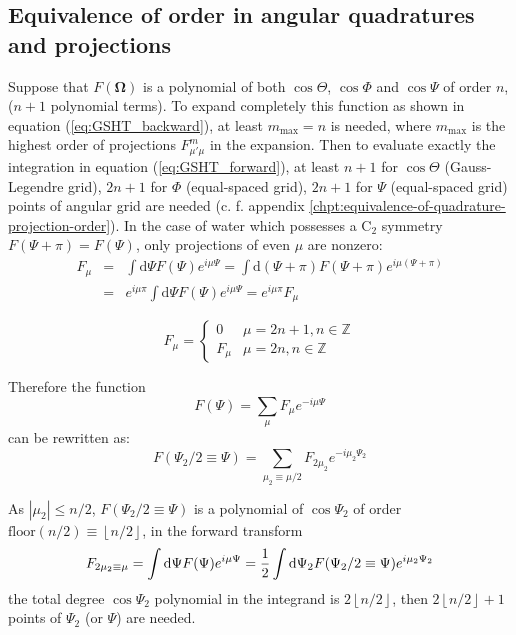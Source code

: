 \subsection{Equivalence of order in angular quadratures and projections}

Suppose that $F(\mathbf{\Omega})$ is a polynomial of both $\cos\Theta$,
$\cos\Phi$ and $\cos\Psi$ of order $n$, ($n+1$ polynomial terms).
To expand completely this function as shown in equation (\ref{eq:GSHT_backward}),
at least $m_{\mathrm{max}}=n$ is needed, where $m_{\mathrm{max}}$
is the highest order of projections $F_{\mu'\mu}^{m}$ in the expansion.
Then to evaluate exactly the integration in equation (\ref{eq:GSHT_forward}),
at least $n+1$ for $\cos\Theta$ (Gauss-Legendre grid), $2n+1$ for
$\Phi$ (equal-spaced grid), $2n+1$ for $\Psi$ (equal-spaced grid)
points of angular grid are needed (c. f. appendix \ref{chpt:equivalence-of-quadrature-projection-order}).
In the case of water which possesses a $\mathrm{C}_{2}$ symmetry
$F(\Psi+\pi)=F(\Psi)$, only projections of even $\mu$ are nonzero:
\begin{eqnarray}
F_{\mu} & = & \int\mathrm{d}\Psi F(\Psi)e^{i\mu\Psi}=\int\mathrm{d}(\Psi+\pi)F(\Psi+\pi)e^{i\mu(\Psi+\pi)}\nonumber \\
 & = & e^{i\mu\pi}\int\mathrm{d}\Psi F(\Psi)e^{i\mu\Psi}=e^{i\mu\pi}F_{\mu}
\end{eqnarray}

\begin{equation}
F_{\mu}=\begin{cases}
0 & \mu=2n+1,n\in\mathbb{Z}\\
F_{\mu} & \mu=2n,n\in\mathbb{Z}
\end{cases}
\end{equation}

Therefore the function
\begin{equation}
F(\Psi)=\sum_{\mu}F_{\mu}e^{-i\mu\Psi}
\end{equation}
can be rewritten as:
\begin{equation}
F(\Psi_{2}/2\equiv\Psi)=\sum_{\mu_{2}\equiv\mu/2}F_{2\mu_{2}}e^{-i\mu_{2}\Psi_{2}}
\end{equation}

As $\left|\mu_{2}\right|\leq n/2$, $F(\Psi_{2}/2\equiv\Psi)$ is
a polynomial of $\cos\Psi_{2}$ of order $\mathrm{floor}(n/2)\equiv\left\lfloor n/2\right\rfloor $,
in the forward transform
\begin{equation}
F_{2\mu_{2}\equiv\mu}=\intop\mathrm{d}\Psi F(\Psi)e^{i\mu\Psi}=\frac{1}{2}\intop\mathrm{d}\Psi_{2}F(\Psi_{2}/2\equiv\Psi)e^{i\mu_{2}\Psi_{2}}
\end{equation}
the total degree $\cos\Psi_{2}$ polynomial in the integrand is $2\left\lfloor n/2\right\rfloor $,
then $2\left\lfloor n/2\right\rfloor +1$ points of $\Psi_{2}$ (or
$\Psi$) are needed. 

